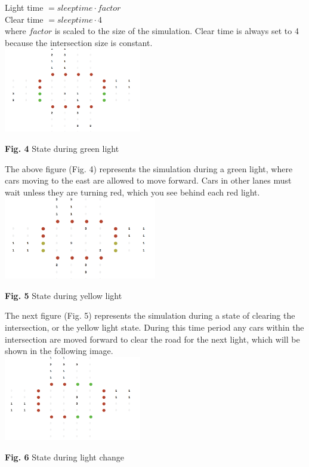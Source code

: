 \documentclass[conference]{IEEEtran}
\begin{document}
Light time $= sleep time \cdot factor$ \\

Clear time $= sleep time \cdot 4$ \\

where $factor$ is scaled to the size of the simulation. Clear time is always set to 4 because the intersection size is constant. \\

\includegraphics[width=0.45\textwidth]{green}
\begin{center}
	\textbf{Fig. 4} State during green light  \\
\end{center}

The above figure (Fig. 4) represents the simulation during a green light, where cars moving to the east are allowed to move forward. Cars in other lanes must wait unless they are turning red, which you see behind each red light. \\

\includegraphics[width=0.5\textwidth]{yellow}
\begin{center}
	\textbf{Fig. 5} State during yellow light  \\
\end{center}

The next figure (Fig. 5) represents the simulation during a state of clearing the intersection, or the yellow light state. During this time period any cars within the intersection are moved forward to clear the road for the next light, which will be shown in the following image. \\

\includegraphics[width=0.45\textwidth]{red}
\begin{center}
	\textbf{Fig. 6} State during light change  \\
\end{center}
\end{document}
